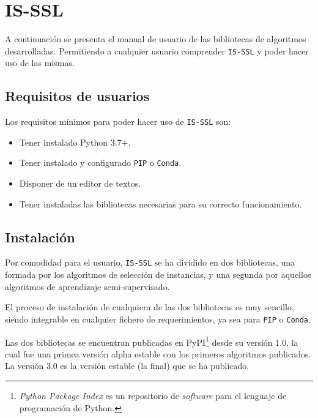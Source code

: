 \FloatBarrier
\section{IS-SSL}
A continuación se presenta el manual de usuario de las bibliotecas de algoritmos desarrolladas. Permitiendo a cualquier usuario comprender \texttt{IS-SSL} y poder hacer uso de las mismas.
\subsection{Requisitos de usuarios}
Los requisitos mínimos para poder hacer uso de \texttt{IS-SSL} son:
\begin{itemize}
\item Tener instalado Python 3.7+.
\item Tener instalado y configurado \texttt{PIP} o \texttt{Conda}.
\item Disponer de un editor de textos.
\item Tener instaladas las bibliotecas necesarias para su correcto funcionamiento.
\end{itemize}

\subsection{Instalación}

Por comodidad para el usuario, \texttt{IS-SSL} se ha dividido en dos bibliotecas, una formada por los algoritmos de selección de instancias, y una segunda por aquellos algoritmos de aprendizaje semi-supervisado.

El proceso de instalación de cualquiera de las dos bibliotecas es muy sencillo, siendo integrable en cualquier fichero de requerimientos, ya sea para \texttt{PIP} o \texttt{Conda}.

Las dos bibliotecas se encuentran publicadas en PyPI\footnote{\textit{Python Package Index} es un repositorio de \textit{software} para el lenguaje de programación de Python.} desde su versión 1.0, la cual fue una primea versión alpha estable con los primeros algoritmos publicados. 
La versión 3.0 es la versión estable (la final) que se ha publicado.


